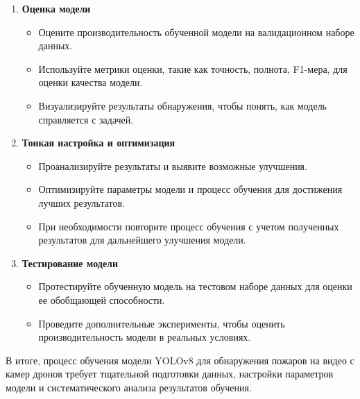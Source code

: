 \begin{enumerate}
        \item \textbf{Оценка модели}
            \begin{itemize}
                \item Оцените производительность обученной модели на валидационном наборе данных.
                \item Используйте метрики оценки, такие как точность, полнота, F1-мера, для оценки качества модели.
                \item Визуализируйте результаты обнаружения, чтобы понять, как модель справляется с задачей.
            \end{itemize}
        \item \textbf{Тонкая настройка и оптимизация}
            \begin{itemize}
                \item Проанализируйте результаты и выявите возможные улучшения.
                \item Оптимизируйте параметры модели и процесс обучения для достижения лучших результатов.
                \item При необходимости повторите процесс обучения с учетом полученных результатов для дальнейшего улучшения модели.
            \end{itemize}
        \item \textbf{Тестирование модели}
            \begin{itemize}
                \item Протестируйте обученную модель на тестовом наборе данных для оценки ее обобщающей способности.
                \item Проведите дополнительные эксперименты, чтобы оценить производительность модели в реальных условиях.
            \end{itemize}
    \end{enumerate}

    В итоге, процесс обучения модели YOLOv8 для обнаружения пожаров на видео с камер дронов требует тщательной подготовки данных, настройки параметров модели и систематического анализа результатов обучения.

